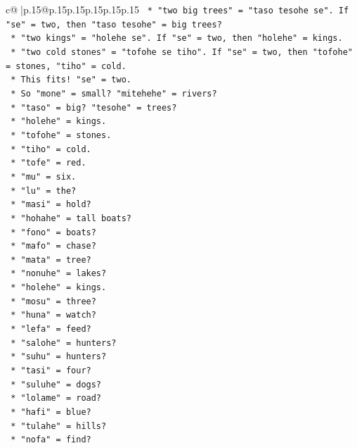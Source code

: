 \documentclass{article}
\begin{document}
{\begin{supertabular}{c@{$\;$}|p{.15\linewidth}@{}p{.15\linewidth}p{.15\linewidth}p{.15\linewidth}p{.15\linewidth}p{.15\linewidth}}
{{{\texttt{        *   "two big trees" = "taso tesohe se". If "se" = two, then "taso tesohe" = big trees?} \\
\texttt{        *   "two kings" = "holehe se". If "se" = two, then "holehe" = kings.} \\
\texttt{        *   "two cold stones" = "tofohe se tiho". If "se" = two, then "tofohe" = stones, "tiho" = cold.} \\
\texttt{        *   This fits! "se" = two.} \\
\texttt{        *   So "mone" = small? "mitehehe" = rivers?} \\
\texttt{        *   "taso" = big? "tesohe" = trees?} \\
\texttt{        *   "holehe" = kings.} \\
\texttt{        *   "tofohe" = stones.} \\
\texttt{        *   "tiho" = cold.} \\
\texttt{        *   "tofe" = red.} \\
\texttt{        *   "mu" = six.} \\
\texttt{        *   "lu" = the?} \\
\texttt{        *   "masi" = hold?} \\
\texttt{        *   "hohahe" = tall boats?} \\
\texttt{        *   "fono" = boats?} \\
\texttt{        *   "mafo" = chase?} \\
\texttt{        *   "mata" = tree?} \\
\texttt{        *   "nonuhe" = lakes?} \\
\texttt{        *   "holehe" = kings.} \\
\texttt{        *   "mosu" = three?} \\
\texttt{        *   "huna" = watch?} \\
\texttt{        *   "lefa" = feed?} \\
\texttt{        *   "salohe" = hunters?} \\
\texttt{        *   "suhu" = hunters?} \\
\texttt{        *   "tasi" = four?} \\
\texttt{        *   "suluhe" = dogs?} \\
\texttt{        *   "lolame" = road?} \\
\texttt{        *   "hafi" = blue?} \\
\texttt{        *   "tulahe" = hills?} \\
\texttt{        *   "nofa" = find?} \\
}}}
\end{supertabular}}
\end{document}
